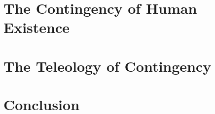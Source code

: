\chapter{The Contingency of Human Existence}

% 

\chapter{The Teleology of Contingency}


\chapter{Conclusion}
